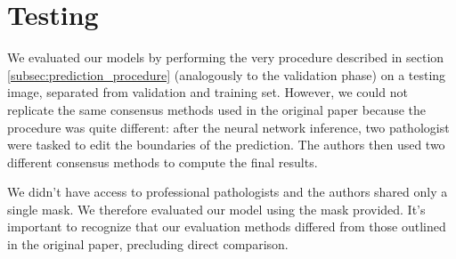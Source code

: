 \section{Testing}

\par
We evaluated our models by performing the very procedure described in section \ref{subsec:prediction_procedure} (analogously to the validation phase) on a testing image, separated from validation and training set. However, we could not replicate the same consensus methods used in the original paper because the procedure was quite different: after the neural network inference, two pathologist were tasked to edit the boundaries of the prediction. The authors then used two different consensus methods to compute the final results.

\par
We didn't have access to professional pathologists and the authors shared only a single mask. We therefore evaluated our model using the mask provided. It's important to recognize that our evaluation methods differed from those outlined in the original paper, precluding direct comparison.